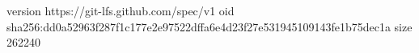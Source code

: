 version https://git-lfs.github.com/spec/v1
oid sha256:dd0a52963f287f1c177e2e97522dffa6e4d23f27e531945109143fe1b75dec1a
size 262240
